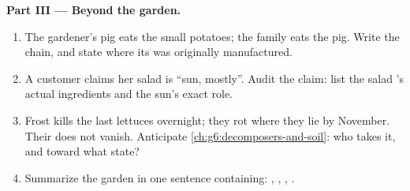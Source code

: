 \begin{problem}
\medskip\noindent\textbf{Part III --- Beyond the garden.}
\begin{enumerate}[resume]
  \item The gardener's pig eats the small potatoes; the
        family eats the pig. Write the chain, and state
        where its  was originally
        manufactured.
  \item A customer claims her salad is ``sun, mostly''.
        Audit the claim: list the salad 's actual
        ingredients and the sun's exact role.
  \item Frost kills the last lettuces overnight; they rot
        where they lie by November. Their 
        does not vanish. Anticipate
        \cref{ch:g6:decomposers-and-soil}: who takes it,
        and toward what state?
  \item Summarize the garden in one sentence containing:
        , , , .
\end{enumerate}
\end{problem}
